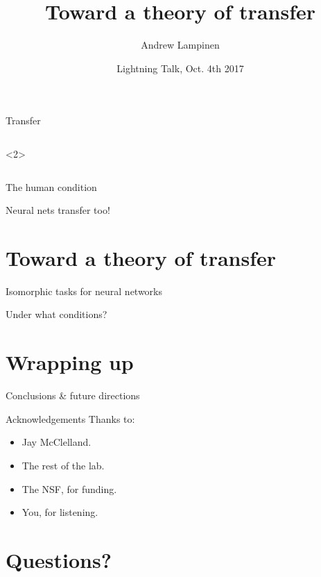 \documentclass{beamer}
\begin{document}
\title{Toward a theory of transfer}
\author{Andrew Lampinen}
\date{Lightning Talk, Oct. 4th 2017}
\frame{\titlepage}

\begin{frame}{Transfer}
\begin{columns}<2>
\begin{column}{0.5\textwidth}
\end{column}
\begin{column}{0.5\textwidth}
\centering
\end{column}
\end{columns}
\end{frame}

\begin{frame}{The human condition}
\end{frame}

\begin{frame}{Neural nets transfer too!}

\end{frame}



\section{Toward a theory of transfer}

\begin{frame}{Isomorphic tasks for neural networks}

\end{frame}

\begin{frame}{Under what conditions?}

\end{frame}



\section{Wrapping up}

\begin{frame}{Conclusions \& future directions}

\end{frame}

\begin{frame}{Acknowledgements}
Thanks to:
\begin{itemize}
    \item Jay McClelland.
    \item The rest of the lab.
    \item The NSF, for funding.
    \item You, for listening. 
\end{itemize}
\end{frame}

\section{Questions?}

\begin{frame}[allowframebreaks]

{\tiny }
\end{frame}
\end{document}
